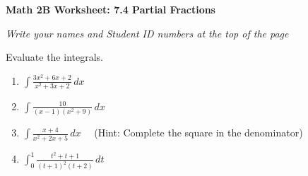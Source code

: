 \documentclass[12pt,fleqn]{article}
\begin{document}
\begin{center}
	\textbf{Math 2B Worksheet: 7.4 Partial Fractions}
\end{center}

\emph{Write your names and Student ID numbers at the top of the page}

Evaluate the integrals.
\begin{enumerate}
\item $\displaystyle \int\frac{3x^2+6x+2}{x^2+3x+2}\,dx$ \vfill

\item $\displaystyle \int\frac{10}{(x-1)(x^2+9)}\,dx$\vfill

\newpage

\item $\displaystyle \int\frac{x+4}{x^2+2x+5}\,dx\quad$   (Hint:  Complete the square in the denominator)\vfill

\item $\displaystyle \int_0^1\frac{t^2+t+1}{(t+1)^2(t+2)}\,dt$\vfill

\end{enumerate}
\end{document}
